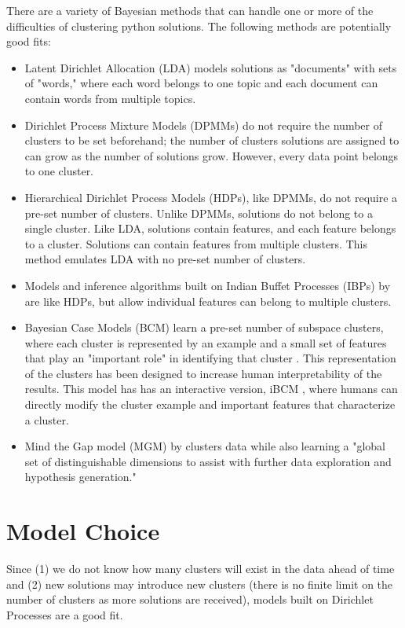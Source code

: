 There are a variety of Bayesian methods that can handle one or more of the difficulties of clustering python solutions. The following methods are potentially good fits: 
\begin{itemize}
\item Latent Dirichlet Allocation (LDA) models solutions as "documents" with sets of "words," where each word belongs to one topic and each document can contain words from multiple topics.
\item Dirichlet Process Mixture Models (DPMMs) do not require the number of clusters to be set beforehand; the number of clusters solutions are assigned to can grow as the number of solutions grow. However, every data point belongs to one cluster.
\item Hierarchical Dirichlet Process Models (HDPs), like DPMMs, do not require a pre-set number of clusters. Unlike DPMMs, solutions do not belong to a single cluster. Like LDA, solutions contain features, and each feature belongs to a cluster. Solutions can contain features from multiple clusters. This method emulates LDA with no pre-set number of clusters. 
\item Models and inference algorithms built on Indian Buffet Processes (IBPs) by \citet{doshi2009indian} are like HDPs, but allow individual features can belong to multiple clusters.
\item Bayesian Case Models (BCM) \citet{beenthesis} learn a pre-set number of subspace clusters, where each cluster is represented by an example and a small set of features that play an "important role" in identifying that cluster \citet{beenNIPS}. This representation of the clusters has been designed to increase human interpretability of the results. This model has has an interactive version, iBCM \cite{beenthesis}, where humans can directly modify the cluster example and important features that characterize a cluster.
\item Mind the Gap model (MGM) by \citet{kim2015mind} clusters data while also learning a "global set of distinguishable dimensions to assist with further data exploration and hypothesis generation."
\end{itemize}

\section{Model Choice}

Since (1) we do not know how many clusters will exist in the data ahead of time and (2) new solutions may introduce new clusters (there is no finite limit on the number of clusters as more solutions are received), models built on Dirichlet Processes are a good fit. 

